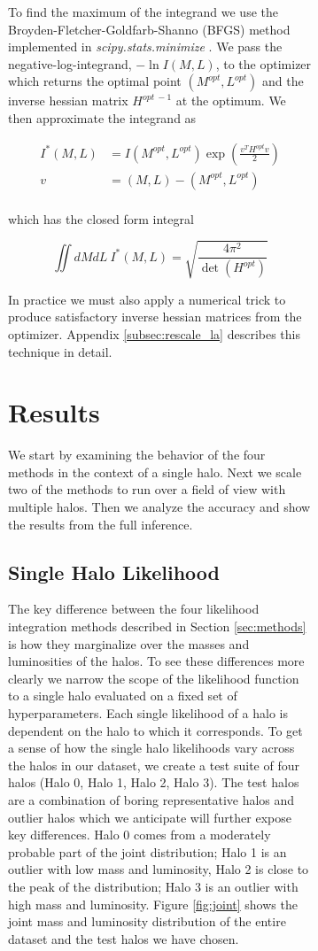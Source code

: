 \documentclass[\docopts]{\docclass}
\begin{document}
\begin{figure}[h!]
\begin{figure}[h!]
To find the maximum of the integrand we use the Broyden-Fletcher-Goldfarb-Shanno (BFGS) method implemented in \emph{scipy.stats.minimize} \citep{scipy}. 
We pass the negative-log-integrand, $-\ln I(M,L)$, to the optimizer which returns the optimal point $(M^{opt}, L^{opt})$ and the inverse hessian matrix $H^{opt\ -1}$ at the optimum. 
We then approximate the integrand as 

\begin{align*}
I^*(M,L) &= I(M^{opt}, L^{opt})\exp\left(\frac{v^TH^{opt}v}{2}\right)\\
v &= (M,L) - (M^{opt}, L^{opt})\\
\end{align*}

\noindent which has the closed form integral 

$$\iint dMdL\ I^*(M,L) = \sqrt{\frac{4\pi^2}{\det(H^{opt})}}$$

\noindent In practice we must also apply a numerical trick to produce satisfactory inverse hessian matrices from the optimizer. Appendix \ref{subsec:rescale_la} describes this technique in detail.


\section{Results}
\label{sec:results}

We start by examining the behavior of the four methods in the context of a single halo. Next we scale two of the methods to run over a field of view with multiple halos. Then we analyze the accuracy and show the results from the full inference.

\subsection{Single Halo Likelihood}
\label{subsec:single_halo}

The key difference between the four likelihood integration methods described in Section \ref{sec:methods} is how they marginalize over the masses and luminosities of the halos. 
To see these differences more clearly we narrow the scope of the likelihood function to a single halo evaluated on a fixed set of hyperparameters.
Each single likelihood of a halo is dependent on the halo to which it corresponds.
To get a sense of how the single halo likelihoods vary across the halos in our dataset, we create a test suite of four halos (Halo 0, Halo 1, Halo 2, Halo 3).
The test halos are a combination of boring representative halos and outlier halos which we anticipate will further expose key differences.
Halo 0 comes from a moderately probable part of the joint distribution; Halo 1 is an outlier with low mass and luminosity, Halo 2 is close to the peak of the distribution; Halo 3 is an outlier with high mass and luminosity.  
Figure \ref{fig:joint} shows the joint mass and luminosity distribution of the entire dataset and the test halos we have chosen.


\end{figure}
\end{figure}
\end{document}
